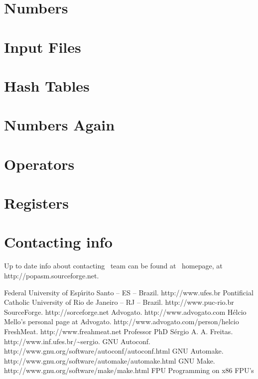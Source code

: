 \documentclass[a4paper,draft,12pt]{book}
\begin{document}
\chapter{Numbers\label{chapnums}}

\chapter{Input Files\label{chapinp}}

\chapter{Hash Tables\label{chaphash}}

\chapter{Numbers Again\label{chapnumsagain}}

\chapter{Operators\label{chapop}}

\chapter{Registers\label{chapregs}}




\appendix

\chapter{Contacting info\label{CONTACT}}
Up to date info about contacting \popasm\ team can be found at \popasm\ 
homepage, at http://popasm.sourceforge.net.

\begin{thebibliography}{12}
 Federal University of Esp\'{\i}rito Santo -- ES -- Brazil.
http://www.ufes.br
 Pontificial Catholic University of Rio de Janeiro -- RJ
-- Brazil. http://www.puc-rio.br
 SourceForge. http://sorceforge.net
Advogato. http://www.advogato.com
H\'elcio Mello's personal page at Advogato.
http://www.advogato.com/person/helcio
FreshMeat. http://www.freahmeat.net
Professor PhD S\'ergio A. A. Freitas.
http://www.inf.ufes.br/\~{}sergio.
GNU Autoconf.
http://www.gnu.org/software/autoconf/autoconf.html
GNU Automake.
http://www.gnu.org/software/automake/automake.html
GNU Make. http://www.gnu.org/software/make/make.html
\bibitem{FPUMAN}FPU Programming on x86 FPU's
\end{thebibliography}
\end{document}
